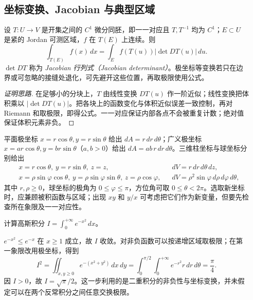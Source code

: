 \subsection{坐标变换、Jacobian 与典型区域}

\begin{theorem}
\label{thm:pei-change-variables}
设 $T:U\to V$ 是开集之间的 $C^1$ 微分同胚，即一一对应且 $T,T^{-1}$ 均为 $C^1$；$E\subset U$ 是紧的 Jordan 可测区域，$f$ 在 $T(E)$ 上连续。则
\begin{equation}
\label{eq:pei-change-variables}
\int_{T(E)}f(x)\,dx
=\int_E f(T(u))|\det DT(u)|\,du.
\end{equation}
$\det DT$ 称为 \emph{Jacobian 行列式（Jacobian determinant）}。极坐标等变换若只在边界或可忽略的接缝处退化，可先避开这些位置，再取极限使用公式。
\end{theorem}
\begin{proof}[证明思路]
在足够小的分块上，$T$ 由线性变换 $DT(u)$ 作一阶近似；线性变换把体积乘以 $|\det DT(u)|$。把各块上的函数变化与体积近似误差一致控制，再对 Riemann 和取极限，即得公式。一一对应保证内部各点不会被重复计数；绝对值保证体积元素非负。
\end{proof}

平面极坐标 $x=r\cos\theta,y=r\sin\theta$ 给出 $dA=r\,dr\,d\theta$；广义极坐标 $x=ar\cos\theta,y=br\sin\theta$（$a,b>0$）给出 $dA=ab\,r\,dr\,d\theta$。三维柱坐标与球坐标分别给出
\begin{align*}
&x=r\cos\theta,\ y=r\sin\theta,\ z=z,
&&dV=r\,dr\,d\theta\,dz,\\
&x=\rho\sin\varphi\cos\theta,\ y=\rho\sin\varphi\sin\theta,
\ z=\rho\cos\varphi,
&&dV=\rho^2\sin\varphi\,d\rho\,d\varphi\,d\theta,
\end{align*}
其中 $r,\rho\ge0$，球坐标的极角为 $0\le\varphi\le\pi$，方位角可取 $0\le\theta<2\pi$。选取新坐标时，应兼顾被积函数与区域；出现 $xy$ 和 $y/x$ 可考虑把它们作为新变量，但要先检查所在象限及一一对应性。

\begin{example}
\label{ex:pei-gaussian-double}
计算高斯积分 $I=\int_0^{+\infty}e^{-x^2}\,dx$。
\end{example}
\begin{solve}
$e^{-x^2}\le e^{-x}$ 在 $x\ge1$ 成立，故 $I$ 收敛。对非负函数可以按递增区域取极限；在第一象限改用极坐标，得到
\[
I^2=\iint_{x,y\ge0}e^{-(x^2+y^2)}\,dx\,dy
=\int_0^{\pi/2}\!\int_0^{+\infty}e^{-r^2}r\,dr\,d\theta
=\frac\pi4.
\]
因 $I>0$，故 $I=\sqrt\pi/2$。这一步利用的是二重积分的非负性与坐标变换，并未假定可以在两个反常积分之间任意交换极限。
\end{solve}

